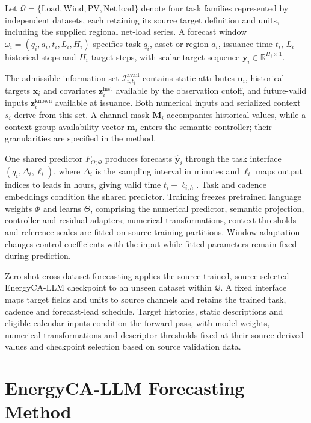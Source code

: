 \documentclass[journal]{IEEEtran}
\begin{document}
Let $\mathcal Q=\{\mathrm{Load},\mathrm{Wind},\mathrm{PV},\mathrm{Net\ load}\}$ denote four task families represented by independent datasets, each retaining its source target definition and units, including the supplied regional net-load series. A forecast window $\omega_i=(q_i,a_i,t_i,L_i,H_i)$ specifies task $q_i$, asset or region $a_i$, issuance time $t_i$, $L_i$ historical steps and $H_i$ target steps, with scalar target sequence $\mathbf y_i\in\mathbb R^{H_i\times1}$.

The admissible information set $\mathcal I_{i,t_i}^{\mathrm{avail}}$ contains static attributes $\mathbf u_i$, historical targets $\mathbf x_i$ and covariates $\mathbf z_i^{\mathrm{hist}}$ available by the observation cutoff, and future-valid inputs $\mathbf z_i^{\mathrm{known}}$ available at issuance. Both numerical inputs and serialized context $s_i$ derive from this set. A channel mask $\mathbf M_i$ accompanies historical values, while a context-group availability vector $\mathbf m_i$ enters the semantic controller; their granularities are specified in the method.

One shared predictor $F_{\Theta;\Phi}$ produces forecasts $\hat{\mathbf y}_i$ through the task interface $(q_i,\Delta_i,\boldsymbol\ell_i)$, where $\Delta_i$ is the sampling interval in minutes and $\boldsymbol\ell_i$ maps output indices to leads in hours, giving valid time $t_i+\ell_{i,h}$. Task and cadence embeddings condition the shared predictor. Training freezes pretrained language weights $\Phi$ and learns $\Theta$, comprising the numerical predictor, semantic projection, controller and residual adapters; numerical transformations, context thresholds and reference scales are fitted on source training partitions. Window adaptation changes control coefficients with the input while fitted parameters remain fixed during prediction.

Zero-shot cross-dataset forecasting applies the source-trained, source-selected EnergyCA-LLM checkpoint to an unseen dataset within $\mathcal Q$. A fixed interface maps target fields and units to source channels and retains the trained task, cadence and forecast-lead schedule. Target histories, static descriptions and eligible calendar inputs condition the forward pass, with model weights, numerical transformations and descriptor thresholds fixed at their source-derived values and checkpoint selection based on source validation data.

\section{EnergyCA-LLM Forecasting Method}
\label{sec:method}
\end{document}
